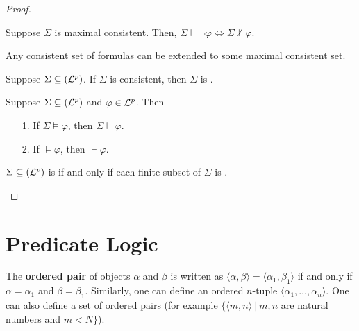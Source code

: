\documentclass[english, 11pt]{article}
\begin{document}
\begin{proof}
    \begin{lem}
      Suppose $\Sigma$ is maximal consistent. Then, $\Sigma \vdash \neg \varphi \iff \Sigma \not \vdash \varphi$.
    \end{lem}

    \begin{lem}\label{Lindenbaum Lemma}
      Any consistent set of formulas can be extended to some maximal consistent set.
    \end{lem}

    \begin{thrm}
      Suppose $\Sigma \subseteq (\mathcal{L}^p)$. If $\Sigma$ is consistent, then $\Sigma$ is .
    \end{thrm}

    \begin{thrm}[completeness]\label{completeness theorem}
      Suppose $\Sigma \subseteq (\mathcal{L}^p)$ and $\varphi \in \mathcal{L}^p$. Then
      \begin{itemize}
        \item[1.] If $\Sigma \models \varphi$, then $\Sigma \vdash \varphi$.
        \item[2.] If $\models \varphi$, then $\vdash \varphi$.
      \end{itemize}
    \end{thrm}

    \begin{thrm}
      $\Sigma \subseteq (\mathcal{L}^p)$ is  if and only if each finite subset of $\Sigma$ is .
    \end{thrm}

  \end{proof}

  \section{Predicate Logic}

  \begin{defn}\label{ordered pair}
  The \textbf{ordered pair} of objects $\alpha$ and $\beta$ is written as $\langle \alpha, \beta \rangle = \langle \alpha_1, \beta_1 \rangle$ if and only if $\alpha = \alpha_1$ and $\beta = \beta_1$. Similarly, one can define an ordered $n$-tuple $\langle \alpha_1, \ldots, \alpha_n \rangle$. One can also define a set of ordered pairs (for example $\{\langle m ,n \rangle \ | \ m,n$ are natural numbers and $m < N \}$).
  \end{defn}
\end{document}
